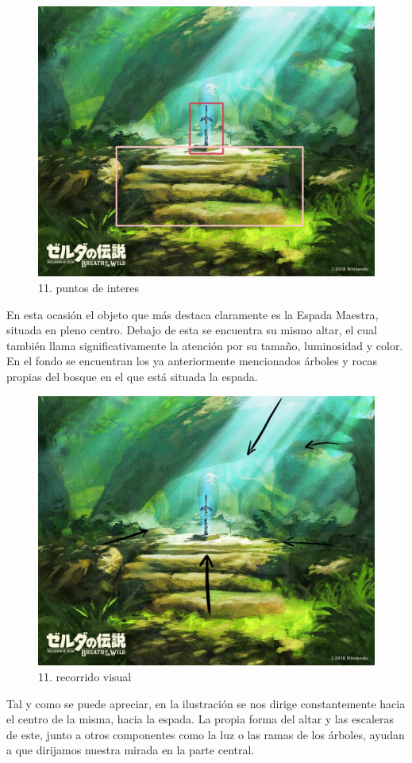 \documentclass[12pt]{article}
\begin{document}
    \begin{figure}[H]
      \centering
      \includegraphics[width=\textwidth]{images/Carlos/12/CuadrosRositas.jpg}
      \caption{\small 11. puntos de interes}
    \end{figure}
    En esta ocasión el objeto que más destaca claramente es la Espada Maestra, situada en pleno centro. Debajo de esta se encuentra su mismo altar, el cual también llama significativamente la atención por su tamaño, luminosidad y color. En el fondo se encuentran los ya anteriormente mencionados árboles y rocas propias del bosque en el que está situada la espada.
    \begin{figure}[H]
      \centering
      \includegraphics[width=\textwidth]{images/Carlos/12/Flechas.jpg}
      \caption{\small 11. recorrido visual}
    \end{figure}
    Tal y como se puede apreciar, en la ilustración se nos dirige constantemente hacia el centro de la misma, hacia la espada. La propia forma del altar y las escaleras de este, junto a otros componentes como la luz o las ramas de los árboles, ayudan a que dirijamos nuestra mirada en la parte central.
\end{document}
